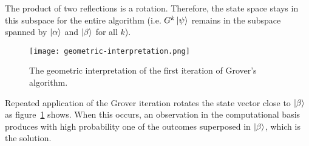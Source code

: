 The product of two reflections is a rotation. Therefore, the state space stays in this subspace for the entire algorithm (i.e. $G^k\ket{\psi}$ remains in the subspace spanned by $\ket{\alpha}$ and $\ket{\beta}$ for all $k$). 

\begin{figure}
\texttt{[image: geometric-interpretation.png]}
\centering
\caption{The geometric interpretation of the first iteration of Grover's algorithm.}
\label{fig:geometric-interpretation}
\end{figure}

Repeated application of the Grover iteration rotates the state vector close to $\ket{\beta}$ as figure~\ref{fig:geometric-interpretation} shows. When this occurs, an observation in the computational basis produces with high probability one of the outcomes superposed in $\ket{\beta}$, which is the solution.


